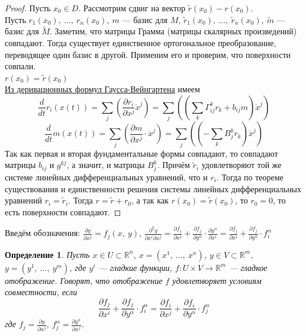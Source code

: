 \documentclass[12pt]{article}
\theoremstyle{plain}
\newtheorem{definition}{Определение}[section]
\newcommand{\R}{\mathbb R}
\begin{document}
    \begin{proof}
        Пусть $x_0\in D$. Рассмотрим сдвиг на вектор $\tilde{r}(x_0)-r(x_0)$.\\Пусть $r_1(x_0), \ \ldots, \ r_n(x_0), \ m$ --- базис для $M$, $\tilde{r}_1(x_0), \ \ldots, \ \tilde{r}_n(x_0), \ \tilde{m}$ --- базис для $\tilde{M}$. Заметим, что матрицы Грамма (матрицы скалярных произведений) совпадают. Тогда существует единственное ортогональное преобразование, переводящее один базис в другой. Применим его и проверим, что поверхности совпали.\\
        $r(x_0)=\tilde{r}(x_0)$\\
        \hyperlink{8}{Из деривационных формул Гаусса-Вейнгартена} имеем $$\frac{d}{dt}r_i(x(t))=\sum\limits_j\left(\frac{\partial r_i}{\partial x^j}\dot{x}^j\right)=\sum\limits_j\left(\left(\sum\limits_{k}\Gamma_{ij}^kr_k+b_{ij}m\right)\dot{x}^j\right)$$
        $$\frac{d}{dt}m(x(t))=\sum\limits_j\left(\frac{\partial m}{\partial x^j}\cdot\dot{x}^j\right)=\sum\limits_j\left(\left(-\sum\limits_{k}B_j^kr_k\right)\dot{x}^j\right)$$
        Так как первая и вторая фундаментальные формы совпадают, то совпадают матрицы $b_{ij}$ и $g^{kj}$, а значит, и матрицы $B_j^k$. Причём $\tilde{r}_i$ удовлетворяют той же системе линейных дифференциальных уравнений, что и $r_i$. Тогда по теореме существования и единственности решения системы линейных дифференциальных уравнений $r_i=\tilde{r}_i$. Тогда $r=\tilde{r}+r_0$, а так как $r(x_0)=\tilde{r}(x_0)$, то $r_0=0$, то есть поверхности совпадают.
    \end{proof}
    Введём обозначения: $\frac{\partial y}{\partial x^j}=f_j(x, \  y)$, $\frac{\partial^2 y}{\partial x^i\partial x^j}=\frac{\partial f_j}{\partial x^i}+\frac{\partial f_j}{\partial y^{\alpha}}\cdot\frac{\partial y^{\alpha}}{\partial x^i}=\frac{\partial f_j}{\partial x^i}+\frac{\partial f_j}{\partial y^{\alpha}}\cdot f_i^{\alpha}$
    \begin{definition}
        Пусть $x\in U\subset\R^n$, $x=(x^1, \ \ldots, \ x^n)$, $y\in V\subset\R^m$, $y=(y^1, \ \ldots, \ y^m)$, где  $y^i$ --- гладкие функции, $f:U\times V\to\R^m$ --- гладкое отображение. Говорят, что отображение $f$ удовлетворяет условиям совместности, если $$\frac{\partial f_j}{\partial x^i}+\frac{\partial f_j}{\partial y^{\alpha}}\cdot f^{\alpha}_i=\frac{\partial f_i}{\partial x^j}+\frac{\partial f_i}{\partial y^{\alpha}}\cdot f^{\alpha}_j$$
        где $f_j=\frac{\partial y}{\partial x^j}$, $f^{\alpha}_j=\frac{\partial y^{\alpha}}{\partial x^j}$.
    \end{definition}
\end{document}
